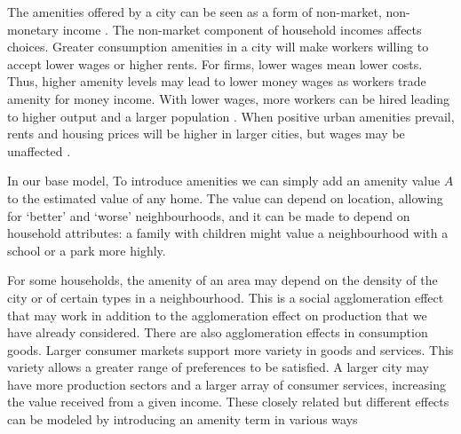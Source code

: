 The amenities offered by a city can be seen as a form of non-market, non-monetary income \cite{kaufmannScalingUrbanAmenities2022}.  The non-market component of household incomes affects choices. Greater consumption amenities in a city will make workers willing to accept lower wages or higher rents. For firms,  lower wages mean lower costs. Thus,  higher amenity levels may lead to lower money wages as workers trade amenity for money income. With lower wages, more workers can be hired leading to higher output and a larger population \cite{pugaMagnitudeCausesAgglomeration2010}. 
When positive urban amenities prevail, rents and housing prices will be higher in larger cities, but wages may be unaffected \cite{robackWagesRentsAmenities1988, dalmazzoAmenitiesSkillbiasedAgglomeration2011}.






In our base model,  To introduce amenities we can simply add an amenity value $A$ to the estimated value of any home. The value can depend on location, allowing for `better' and `worse' neighbourhoods,  and it can be made to depend on household attributes: a family with children might value a neighbourhood with a school or a park more highly. 

For some households, the amenity of an area may depend on the density of the city or of certain types in a neighbourhood. This is a social agglomeration effect that may work in addition to the agglomeration effect on production \cite{gurwitzCatastrophicAgglomeration2019} that we have already considered. There are also agglomeration effects in consumption goods. Larger consumer markets support more variety in goods and services. This variety allows a greater range of preferences to be satisfied. A larger city may have more production sectors and a larger array of consumer services, increasing the value received from a given income.  These closely related but different effects can be modeled by introducing an amenity term in various ways 

